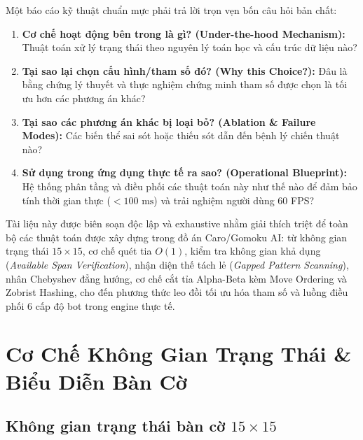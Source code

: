 \documentclass[11pt,a4paper]{report}
\begin{document}
Một báo cáo kỹ thuật chuẩn mực phải trả lời trọn vẹn bốn câu hỏi bản chất:
\begin{enumerate}
    \item \textbf{Cơ chế hoạt động bên trong là gì? (Under-the-hood Mechanism):} Thuật toán xử lý trạng thái theo nguyên lý toán học và cấu trúc dữ liệu nào?
    \item \textbf{Tại sao lại chọn cấu hình/tham số đó? (Why this Choice?):} Đâu là bằng chứng lý thuyết và thực nghiệm chứng minh tham số được chọn là tối ưu hơn các phương án khác?
    \item \textbf{Tại sao các phương án khác bị loại bỏ? (Ablation \& Failure Modes):} Các biến thể sai sót hoặc thiếu sót dẫn đến bệnh lý chiến thuật nào?
    \item \textbf{Sử dụng trong ứng dụng thực tế ra sao? (Operational Blueprint):} Hệ thống phân tầng và điều phối các thuật toán này như thế nào để đảm bảo tính thời gian thực ($< 100\text{ ms}$) và trải nghiệm người dùng 60 FPS?
\end{enumerate}

Tài liệu này được biên soạn độc lập và exhaustive nhằm giải thích triệt để toàn bộ các thuật toán được xây dựng trong đồ án Caro/Gomoku AI: từ không gian trạng thái $15 \times 15$, cơ chế quét tia $O(1)$, kiểm tra không gian khả dụng (\textit{Available Span Verification}), nhận diện thế tách lẻ (\textit{Gapped Pattern Scanning}), nhân Chebyshev đẳng hướng, cơ chế cắt tỉa Alpha-Beta kèm Move Ordering và Zobrist Hashing, cho đến phương thức leo đồi tối ưu hóa tham số và luồng điều phối 6 cấp độ bot trong engine thực tế.

\tableofcontents
\newpage
{}

\chapter{Cơ Chế Không Gian Trạng Thái \& Biểu Diễn Bàn Cờ}

\section{Không gian trạng thái bàn cờ $15 \times 15$}
\end{document}
